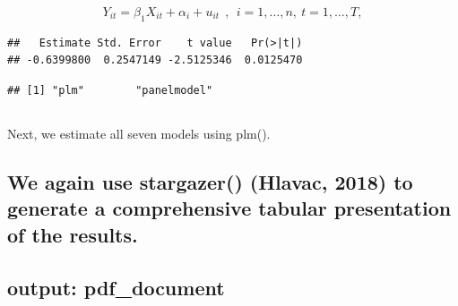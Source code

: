 \documentclass[
]{article}
\begin{document}
\[Y_{it} = \beta_1 X_{it} + \alpha_i + u_{it} \ \ , \ \ i=1,\dots,n, \ t=1,\dots,T,\]

\begin{verbatim}
##   Estimate Std. Error    t value   Pr(>|t|) 
## -0.6399800  0.2547149 -2.5125346  0.0125470
\end{verbatim}

\begin{verbatim}
## [1] "plm"        "panelmodel"
\end{verbatim}

\hypertarget{section}{%
\subsection{}\label{section}}

Next, we estimate all seven models using plm().

\hypertarget{we-again-use-stargazer-hlavac-2018-to-generate-a-comprehensive-tabular-presentation-of-the-results.}{%
\subsection{We again use stargazer() (Hlavac, 2018) to generate a
comprehensive tabular presentation of the
results.}\label{we-again-use-stargazer-hlavac-2018-to-generate-a-comprehensive-tabular-presentation-of-the-results.}}

\hypertarget{output-pdf_document}{%
\subsection{output: pdf\_document}\label{output-pdf_document}}

 
  \providecommand{\huxb}[2]{\arrayrulecolor[RGB]{#1}\global\arrayrulewidth=#2pt}
  \providecommand{\huxvb}[2]{\color[RGB]{#1}\vrule width #2pt}
  \providecommand{\huxtpad}[1]{\rule{0pt}{\baselineskip+#1}}
  \providecommand{\huxbpad}[1]{\rule[-#1]{0pt}{#1}}
\end{document}
